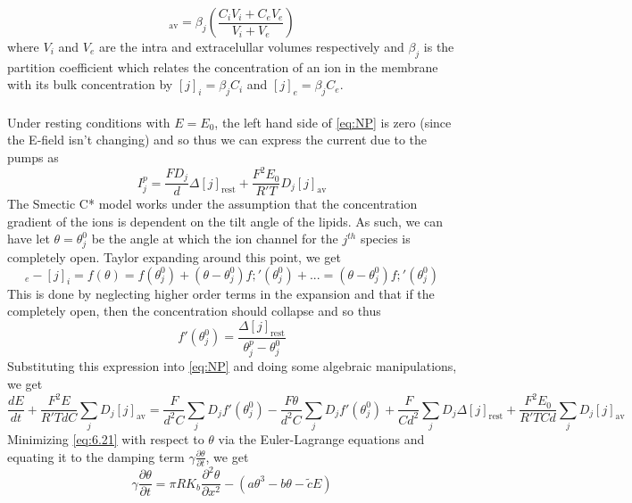 \documentclass{article}
\newcommand{\pd}[2]{\frac{\partial #1}{\partial #2}}
\newcommand{\od}[2]{\frac{d #1}{d #2}}
\newcommand{\pdt}[2]{\frac{\partial ^2 #1}{\partial #2 ^2}}
\numberwithin{equation}{section}
\begin{document}
\begin{equation}
    [j]_{\text{av}} = \beta_j \left( \frac{C_iV_i + C_eV_e}{V_i+V_e}\right)
\end{equation}
where $V_i$ and $V_e$ are the intra and extracelullar volumes respectively and $\beta_j$ is the partition coefficient which relates the concentration of an ion in the membrane with its bulk concentration by $[j]_i = \beta_jC_i$ and $[j]_e = \beta_jC_e$.\\\\
Under resting conditions with $E=E_0$, the left hand side of \eqref{eq:NP} is zero (since the E-field isn't changing) and so thus we can express the current due to the pumps as 
\begin{equation}
    I^p_j = \frac{FD_j}{d} \Delta [j]_{\text{rest}} + \frac{F^2E_0}{R'T}D_j [j]_{\text{av}}
\end{equation}
The Smectic C* model works under the assumption that the concentration gradient of the ions is dependent on the tilt angle of the lipids. As such, we can have let $\theta = \theta^0_j$ be the angle at which the ion channel for the $j^{th}$ species is completely open. Taylor expanding around this point, we get 
\begin{equation}
    [j]_e-[j]_i = f(\theta) = f(\theta^0_j) + (\theta - \theta^0_j)f;'(\theta^0_j) +... = (\theta - \theta^0_j)f;'(\theta^0_j)
\end{equation}
This is done by neglecting higher order terms in the expansion and that if the completely open, then the concentration should collapse and so thus 
\begin{equation}
    f'(\theta^0_j) = \frac{\Delta [j]_{\text{rest}}}{\theta^p_j - \theta^0_j}
\end{equation}
Substituting this expression into \eqref{eq:NP} and doing some algebraic manipulations, we get 
\begin{equation}
    \od{E}{t} + \frac{F^2E}{R'TdC}\sum_j D_j[j]_{\text{av}} = \frac{F}{d^2C}\sum_jD_jf'(\theta^0_j) - \frac{F\theta}{d^2C} \sum_jD_jf'(\theta^0_j) + \frac{F}{Cd^2}\sum_j D_j \Delta [j]_{\text{rest}} + \frac{F^2E_0}{R'TCd}\sum_j D_j [j]_{\text{av}} \label{eq:6.37}
\end{equation}
Minimizing \eqref{eq:6.21} with respect to $\theta$ via the Euler-Lagrange equations and equating it to the damping term $\gamma \pd{\theta}{t}$, we get 
\begin{equation}
    \gamma \pd{\theta}{t} = \pi RK_b \pdt{\theta}{x} -(a\theta^3-b\theta -\tilde{c}E) \label{eq:6.38}
\end{equation}
\end{document}
